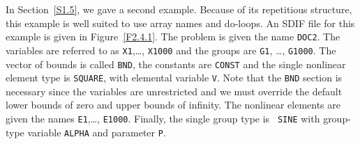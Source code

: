 \documentclass[a4paper]{article}
\begin{document}
In  Section~\ref{S1.5}, we gave  a  second  example.    Because of its
repetitious structure,
this example is well suited  to use array names
and do-loops.    An    SDIF  file for this   example   is   given in
Figure~\ref{F2.4.1}. The problem  is given the name {\tt   DOC2}.  The
variables  are  referred to  as {\tt X1},\ldots,  {\tt  X1000} and the
groups
are {\tt G1},  \ldots, {\tt G1000}.    The vector of bounds
is called {\tt BND},
the constants  are {\tt CONST} and  the single nonlinear
element type
is {\tt SQUARE}, with  elemental variable
{\tt V}.  Note
that  the   {\tt  BND} section  is  necessary  since the variables are
unrestricted and we must override the default lower bounds of zero and
upper bounds of infinity.
 The nonlinear elements are
given the names
{\tt E1},\ldots, {\tt E1000}.  Finally, the single group type
is {\tt
SINE} with group-type variable
{\tt ALPHA} and parameter
{\tt P}.
\end{document}
